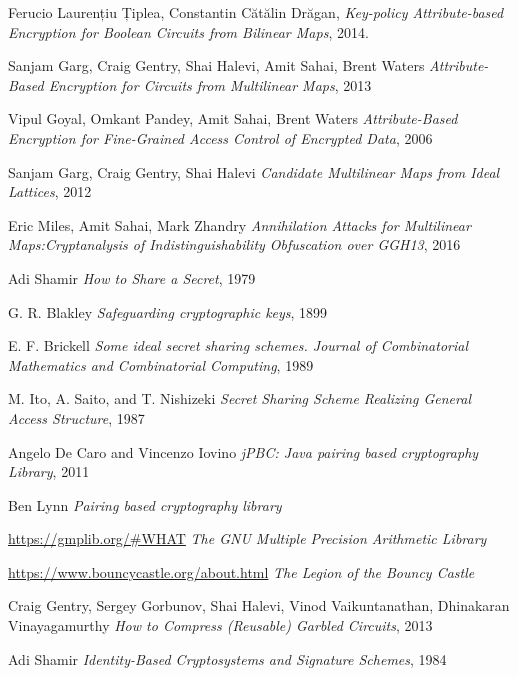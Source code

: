 \documentclass[12pt]{article}
\newcommand\blankpage{%
    \null
    \thispagestyle{empty}%
    \addtocounter{page}{-1}%
    \newpage}
\begin{document}
\pagebreak

\blankpage

\begin{thebibliography}{9}

Ferucio Laurențiu Țiplea, Constantin Cătălin Drăgan, 
\textit{Key-policy Attribute-based Encryption for Boolean Circuits from Bilinear Maps}, 2014.

Sanjam Garg, Craig Gentry, Shai Halevi, Amit Sahai, Brent Waters 
\textit{Attribute-Based Encryption for Circuits from Multilinear Maps}, 2013
 
Vipul Goyal, Omkant Pandey, Amit Sahai, Brent Waters 
\textit{Attribute-Based Encryption for Fine-Grained Access Control of Encrypted Data}, 2006

Sanjam Garg, Craig Gentry, Shai Halevi
\textit{Candidate Multilinear Maps from Ideal Lattices}, 2012

Eric Miles, Amit Sahai, Mark Zhandry
\textit{Annihilation Attacks for Multilinear Maps:Cryptanalysis of Indistinguishability Obfuscation over GGH13}, 2016

Adi Shamir
\textit{How to Share a Secret}, 1979

G. R. Blakley
\textit{Safeguarding cryptographic keys}, 1899

E. F. Brickell
\textit{Some ideal secret sharing schemes. Journal of Combinatorial Mathematics and Combinatorial Computing}, 1989

M. Ito, A. Saito, and T. Nishizeki
\textit{Secret Sharing Scheme Realizing General Access Structure}, 1987

Angelo {De Caro} and Vincenzo Iovino
\textit{jPBC: Java pairing based cryptography Library}, 2011

Ben Lynn
\textit{Pairing based cryptography library}

\href{https://gmplib.org/\#WHAT}{https://gmplib.org/\#WHAT}
\textit{The GNU Multiple Precision Arithmetic Library}

\href{https://www.bouncycastle.org/about.html}{https://www.bouncycastle.org/about.html}
\textit{The Legion of the Bouncy Castle}

Craig Gentry, Sergey Gorbunov, Shai Halevi, Vinod Vaikuntanathan, Dhinakaran Vinayagamurthy
\textit{How to Compress (Reusable) Garbled Circuits}, 2013

Adi Shamir
\textit{Identity-Based Cryptosystems and Signature Schemes}, 1984 


\end{thebibliography}
\end{document}
